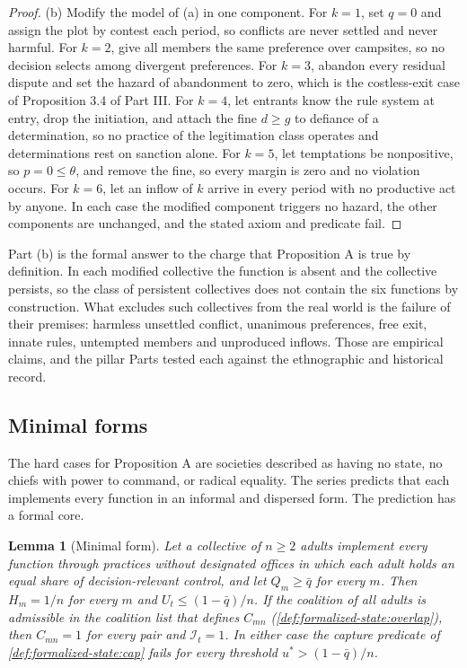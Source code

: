 \documentclass[11pt,letterpaper]{article}
\newtheorem{lemma}[theorem]{Lemma}
\theoremstyle{definition}
\theoremstyle{remark}
\newcommand{\Integ}{\mathcal{I}}
\begin{document}
\begin{proof}
(b) Modify the model of (a) in one component. For $k=1$, set $q=0$ and assign the plot by contest each period, so conflicts are never settled and never harmful. For $k=2$, give all members the same preference over campsites, so no decision selects among divergent preferences. For $k=3$, abandon every residual dispute and set the hazard of abandonment to zero, which is the costless-exit case of Proposition 3.4 of Part III. For $k=4$, let entrants know the rule system at entry, drop the initiation, and attach the fine $d\ge g$ to defiance of a determination, so no practice of the legitimation class operates and determinations rest on sanction alone. For $k=5$, let temptations be nonpositive, so $p=0\le\theta$, and remove the fine, so every margin is zero and no violation occurs. For $k=6$, let an inflow of $k$ arrive in every period with no productive act by anyone. In each case the modified component triggers no hazard, the other components are unchanged, and the stated axiom and predicate fail.
\end{proof}

Part (b) is the formal answer to the charge that Proposition A is true by definition. In each modified collective the function is absent and the collective persists, so the class of persistent collectives does not contain the six functions by construction. What excludes such collectives from the real world is the failure of their premises: harmless unsettled conflict, unanimous preferences, free exit, innate rules, untempted members and unproduced inflows. Those are empirical claims, and the pillar Parts tested each against the ethnographic and historical record.

\subsection{Minimal forms}

The hard cases for Proposition A are societies described as having no state, no chiefs with power to command, or radical equality. The series predicts that each implements every function in an informal and dispersed form. The prediction has a formal core.

\begin{lemma}[Minimal form]
\label{lem:formalized-state:minimal}
Let a collective of $n\ge2$ adults implement every function through practices without designated offices in which each adult holds an equal share of decision-relevant control, and let $Q_m\ge\bar q$ for every $m$. Then $H_m=1/n$ for every $m$ and $U_t\le(1-\bar q)/n$. If the coalition of all adults is admissible in the coalition list that defines $C_{mn}$ (\cref{def:formalized-state:overlap}), then $C_{mn}=1$ for every pair and $\Integ_t=1$. In either case the capture predicate of \cref{def:formalized-state:cap} fails for every threshold $u^{*}>(1-\bar q)/n$.
\end{lemma}
\end{document}
